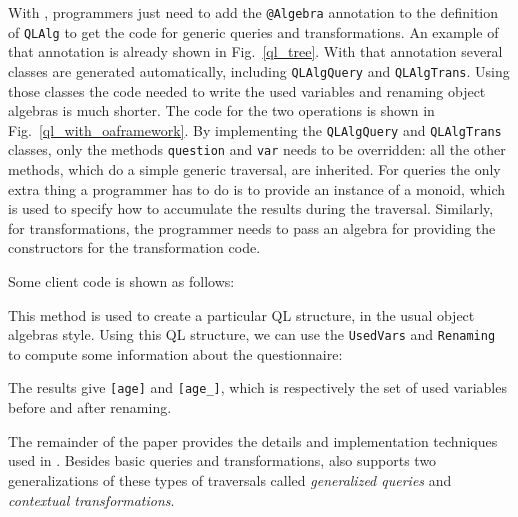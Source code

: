 With \Name, programmers just need to add the \lstinline{@Algebra} annotation
to the definition of \lstinline{QLAlg} to get the code for generic
queries and transformations. An example of that annotation is already
shown in Fig.~\ref{ql_tree}. With that annotation several classes
are generated automatically, including \lstinline{QLAlgQuery} and
\lstinline{QLAlgTrans}. Using those classes the code needed to write
the used variables and renaming object algebras is much
shorter. The code for the two operations is shown in
Fig.~\ref{ql_with_oaframework}. By implementing the
\lstinline{QLAlgQuery} and \lstinline{QLAlgTrans} classes, only the methods
\lstinline{question} and \lstinline{var} needs to be overridden: all the other methods,
which do a simple generic traversal, are inherited. For queries the
only extra thing a programmer has to do is to provide an instance of a
monoid, which is used to specify how to accumulate the results during
the traversal. Similarly, for transformations, the programmer needs to
pass an algebra for providing the constructors for the transformation
code.

Some client code is shown as follows: %


This method is used to create a particular QL structure, in the
usual object algebras style.
Using this QL structure, we can use the \lstinline{UsedVars}
and \lstinline{Renaming} to compute some information about the questionnaire:


The results give \lstinline{[age]} and \lstinline{[age_]}, which
is respectively the set of used variables before and after renaming.

The remainder of the paper provides the details and implementation
techniques used in \Name. Besides basic queries and transformations,
\name also supports two generalizations of these types of traversals
called \emph{generalized queries} and \emph{contextual transformations}.

